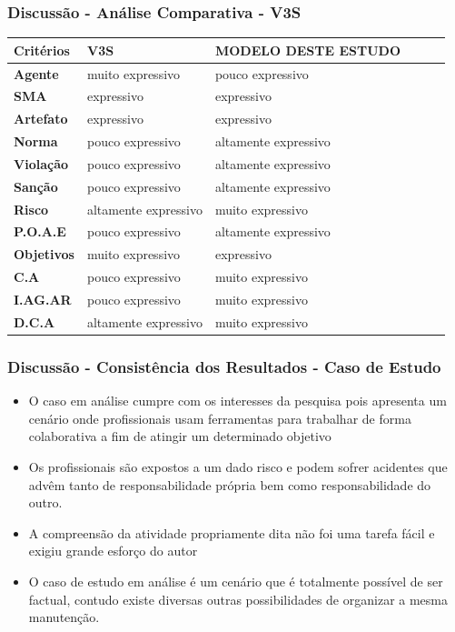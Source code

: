 \documentclass{beamer}
\begin{document}
\begin{frame}
	\frametitle{Discussão - Análise Comparativa - V3S}
	\begin{table}[H]
	    \begin{tabular}{|l|l|l|l|l|l|}
        \textbf{Critérios} 	&	 \textbf{V3S}         	&	 \textbf{MODELO DESTE ESTUDO} \\ \hline
        \textbf{Agente}    	&	 muito expressivo     	&	 pouco expressivo             \\ \hline
        \textbf{SMA}       	&	 expressivo           	&	 expressivo                   \\ \hline
        \textbf{Artefato}  	&	 expressivo           	&	 expressivo                   \\ \hline
        \textbf{Norma}     	&	 pouco expressivo     	&	 altamente expressivo         \\ \hline
        \textbf{Violação}  	&	 pouco expressivo     	&	 altamente expressivo         \\ \hline
        \textbf{Sanção}    	&	 pouco expressivo     	&	 altamente expressivo         \\ \hline
        \textbf{Risco}     	&	 altamente expressivo 	&	 muito expressivo             \\ \hline
        \textbf{P.O.A.E}   	&	 pouco expressivo     	&	 altamente expressivo         \\ \hline
        \textbf{Objetivos} 	&	 muito expressivo       &	 expressivo             	  \\ \hline
        \textbf{C.A}       	&	 pouco expressivo     	&	 muito expressivo             \\ \hline
        \textbf{I.AG.AR}   	&	 pouco expressivo     	&	 muito expressivo             \\ \hline
        \textbf{D.C.A}     	&	 altamente expressivo 	&	 muito expressivo             \\ \hline
	    \end{tabular}
	\end{table}	
\end{frame}

\begin{frame}
	\frametitle{Discussão - Consistência dos Resultados - Caso de Estudo}
	\begin{itemize}
		\item  O caso em análise cumpre com os interesses da pesquisa pois apresenta um cenário onde profissionais usam ferramentas para trabalhar de forma colaborativa a fim de atingir um determinado objetivo
		\item Os profissionais são expostos a um dado risco e podem sofrer acidentes que advêm tanto de responsabilidade própria bem como responsabilidade do outro.
		\item A compreensão da atividade propriamente dita não foi uma tarefa fácil e exigiu grande esforço do autor
		\item O caso de estudo em análise é um cenário que é totalmente possível de ser factual, contudo existe diversas outras possibilidades de organizar a mesma manutenção.
	\end{itemize}
\end{frame}
\end{document}
